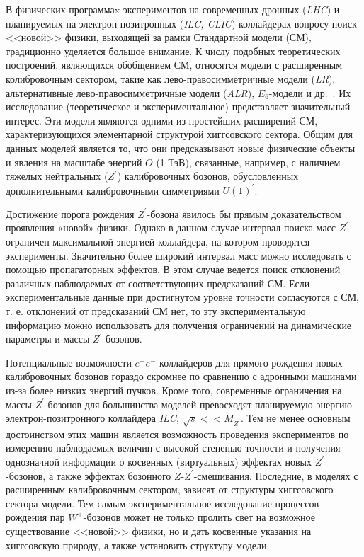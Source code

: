 В физических программаx экспериментов на  современных  дронных (\textit{LHC}) и планируемых на  электрон-позитронных (\textit{ILC, CLIC}) коллайдерах вопросу поиск  <<новой>> физики, выходящей за  рамки Стандартной модели (СМ), традиционно уделяется большое внимание. К числу подобных теоретических построений, являющихся обобщением СМ, относятся модели с расширенным колибровочным сектором, такие как лево-правосимметричные модели (\textit{LR}), альтернативные лево-правосимметричные модели (\textit{ALR}), $E_6$-модели
и др.~\cite{Bobovnikov:2016}. Их исследование (теоретическое и экспериментальное) представляет значительный интерес. Эти модели являются одними из простейших расширений СМ, характеризующихся элементарной структурой хиггсовского сектора. Общим для данных моделей является то, что они предсказывают новые физические объекты и явления на масштабе энергий $O$ (1 ТэВ), связанные, например, с наличием тяжелых нейтральных ($Z^\prime$) калибровочных бозонов, обусловленных дополнительными калибровочными симметриями $U(1)^\prime$.

Достижение порога рождения $Z^\prime$-бозона явилось бы прямым доказательством проявления «новой» физики. Однако в данном случае интервал поиска масс $Z^\prime$ ограничен максимальной энергией коллайдера, на котором проводятся эксперименты. Значительно более широкий интервал масс можно исследовать с помощью пропагаторных эффектов. В этом случае ведется поиск отклонений различных наблюдаемых от соответствующих предсказаний СМ. Если экспериментальные данные при достигнутом уровне точности согласуются с СМ, т. е. отклонений от предсказаний СМ нет, то эту экспериментальную информацию можно использовать для получения ограничений на динамические параметры и массы $Z^\prime$-бозонов.

Потенциальные возможности $e^+$$e^-$-коллайдеров для прямого рождения новых калибровочных бозонов гораздо скромнее по сравнению с адронными машинами из-за более низких энергий пучков. Кроме того, современные ограничения на массы $Z^\prime$-бозонов для большинства моделей превосходят планируемую энергию электрон-позитронного коллайдера \textit{ILC}, $\sqrt{s}<< M_{Z^\prime}$. Тем не менее основным достоинством этих машин является возможность проведения экспериментов по измерению наблюдаемых величин с высокой степенью точности и получения однозначной информации о косвенных (виртуальных) эффектах новых $Z^\prime$-бозонов, а также эффектах бозонного $Z$-$Z^\prime$-смешивания. Последние, в моделях с расширенным калибровочным сектором, зависят от структуры хиггсовского сектора модели. Тем самым экспериментальное исследование процессов рождения пар $W^±$-бозонов может не только пролить свет на возможное существование <<новой>> физики, но и дать косвенные указания на хиггсовскую природу, а также установить структуру модели.

